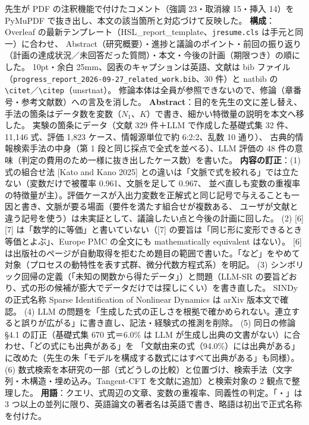 \documentclass[11pt,a4paper]{jsarticle}
\begin{document}
\begin{itemize}[nosep]
    先生が PDF の注釈機能で付けたコメント（強調 23・取消線 15・挿入 14）を PyMuPDF で抜き出し、本文の該当箇所と対応づけて反映した。
    \textbf{構成}：Overleaf の最新テンプレート（HSL\_report\_template、\texttt{jresume.cls} は手元と同一）に合わせ、
    Abstract（研究概要）・進捗と議論のポイント・前回の振り返り（計画の達成状況／未回答だった質問）・本文・今後の計画（期限つき）の順にした。
    10pt・余白 25mm、図表のキャプションは英語、文献は bib ファイル（\texttt{progress\_report\_2026-09-27\_related\_work.bib}、30 件）と natbib の \texttt{\textbackslash citet}／\texttt{\textbackslash citep}（unsrtnat）。
    修論本体は全員が参照できないので、修論（章番号・参考文献数）への言及を消した。
    \textbf{Abstract}：目的を先生の文に差し替え、手法の箇条はデータ数を変数（$N_1$、$K$）で書き、細かい特徴量の説明を本文へ移した。
    実験の箇条にデータ（文献 329 件＋LLM で作成した基礎式集 32 件、11,146 式、評価 1,823 ケース、情報源単位で約 6:2:2、乱数 10 通り）、
    古典的情報検索手法の中身（第 1 段と同じ採点で全式を並べる）、LLM 評価の 48 件の意味（判定の費用のため一様に抜き出したケース数）を書いた。
    \textbf{内容の訂正}：(1) 式の組合せ法 [Kato and Kano 2025] との違いは「文脈で式を絞れる」では立たない（変数だけで被覆率 0.961、文脈を足して 0.967、
    並べ直しも変数の重複率の特徴量が主）。評価ケースが入出力変数を正解式と同じ記号で与えることも一因と書き、文脈が要る場面（要件を満たす組合せが複数ある、
    ユーザが文献と違う記号を使う）は未実証として、議論したい点と今後の計画に回した。
    (2) [6][7] は「数学的に等価」と書いていない（[7] の要旨は「同じ形に変形できるとき等価とよぶ」、Europe PMC の全文にも mathematically equivalent はない）。
    [6] は出版社のページが自動取得を拒むため題目の範囲で書いた。「など」をやめて対象（プロセスの動特性を表す式群、微分代数方程式系）を明記。
    (3) シンボリック回帰の定義（「未知の関数から得たデータ」）と問題（LLM-SR の要旨どおり、式の形の候補が膨大でデータだけでは探しにくい）を書き直した。
    SINDy の正式名称 Sparse Identification of Nonlinear Dynamics は arXiv 版本文で確認。
    (4) LLM の問題を「生成した式の正しさを根拠で確かめられない。連立すると誤りが広がる」に書き直し、記法・経験式の推測を削除。
    (5) 同日の修論 \S4.1 の訂正（基礎式集 670 式＝6.0\% は LLM が生成し出典の文書がない）に合わせ、「どの式にも出典がある」を
    「文献由来の式（94.0\%）には出典がある」に改めた（先生の朱「モデルを構成する数式にはすべて出典がある」も同様）。
    (6) 数式検索を本研究の一部（式どうしの比較）と位置づけ、検索手法（文字列・木構造・埋め込み。Tangent-CFT を文献に追加）と検索対象の 2 観点で整理した。
    \textbf{用語}：クエリ、式周辺の文章、変数の重複率、同義性の判定。「・」は 3 つ以上の並列に限り、英語論文の著者名は英語で書き、略語は初出で正式名称を付けた。

\end{itemize}
\end{document}
